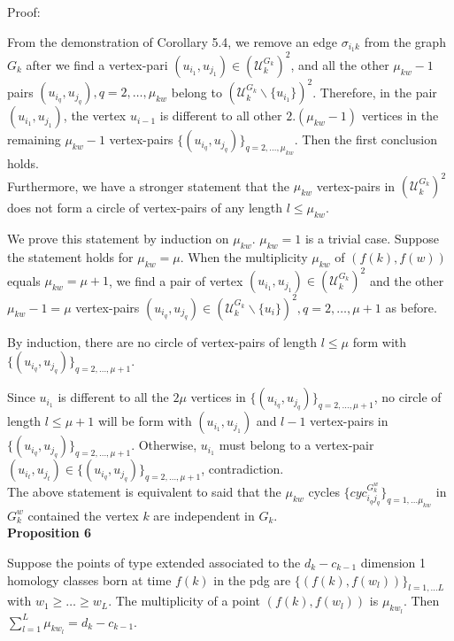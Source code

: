 \documentclass[a4paper,12pt]{article}
\numberwithin{equation}{section}
\begin{document}
	
	\noindent Proof:
	
	From the demonstration of Corollary 5.4, we remove an edge $\sigma_{i_1 k}$ from the graph $G_k$ after we find a vertex-pari $(u_{i_1},u_{j_1}) \in (\mathcal{U}_k^{G_k})^2$, and all the other $\mu_{kw}-1$ pairs $(u_{i_q},u_{j_q}), q= 2,\ldots,\mu_{kw}$ belong to $( \mathcal{U}_k^{G_k} \backslash \{u_{i_1}\} )^2$. Therefore, in the pair $(u_{i_1},u_{j_1})$, the vertex $u_{i-1}$ is different to all other $2.(\mu_{kw}-1)$ vertices in the remaining $\mu_{kw}-1$ vertex-pairs $\{ (u_{i_q},u_{j_q}) \}_{q=2,\ldots,\mu_{kw}}$. Then the first conclusion holds.\\
	
	Furthermore, we have a stronger statement that the $\mu_{kw}$ vertex-pairs in $(\mathcal{U}_k^{G_k})^2$ does not form a circle of vertex-pairs of any length $l \leq \mu_{kw}$. 
	
	We prove this statement by induction on $\mu_{kw}$. $\mu_{kw} = 1$ is a trivial case. Suppose the statement holds for $\mu_{kw} = \mu$. When the multiplicity $\mu_{kw}$ of $(f(k),f(w))$ equals $\mu_{kw} = \mu +1$, we find a pair of vertex $(u_{i_1},u_{j_1}) \in (\mathcal{U}_k^{G_k})^2$ and the other $\mu_{kw}-1 = \mu$ vertex-pairs $(u_{i_q},u_{j_q}) \in ( \mathcal{U}_k^{G_k} \backslash \{u_i\} )^2, q=2,\ldots,\mu+1$ as before. 
	
	By induction, there are no circle of vertex-pairs of length $l \leq \mu$ form with $\{ (u_{i_q}, u_{j_q}) \}_{q=2,\ldots,\mu+1}$. 
	
	Since $u_{i_1}$ is different to all the $2\mu$ vertices in $\{ (u_{i_q}, u_{j_q}) \}_{q=2,\ldots,\mu+1}$, no circle of length $l \leq \mu+1$ will be form with $(u_{i_1},u_{j_1})$ and $l-1$ vertex-pairs in $\{ (u_{i_q}, u_{j_q}) \}_{q=2,\ldots,\mu+1}$. Otherwise, $u_{i_1}$ must belong to a vertex-pair $(u_{i_t},u_{j_t}) \in \{ (u_{i_q}, u_{j_q}) \}_{q=2,\ldots,\mu+1}$, contradiction.\\
	
	The above statement is equivalent to said that the $\mu_{kw}$ cycles $\{cyc_{i_q j_q}^{G^w_k}\}_{q=1,\ldots \mu_{kw}}$ in $G_k^w$ contained the vertex $k$ are independent in $G_k$.\\
	
	
	
	\noindent \textbf{Proposition 6}
	
	Suppose the points of type extended associated to the $d_k - c_{k-1}$ dimension 1 homology classes born at time $f(k)$ in the pdg are $\{(f(k),f(w_l))\}_{l = 1,\ldots L}$ with $w_1 \geq \ldots \geq w_L$. The multiplicity of a point $(f(k),f(w_l))$ is $\mu_{kw_l}$. Then $\sum_{l=1}^L \mu_{kw_l} = d_k - c_{k-1}$. 
	
\end{document}
